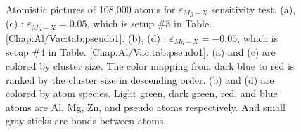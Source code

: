 \begin{figure}[!ht]
\caption[Atomistic pictures of 108,000 atoms for $\varepsilon_{Mg-X}$ sensitivity test.]{Atomistic pictures of 108,000 atoms for $\varepsilon_{Mg-X}$ sensitivity test. (a), (c) : $\varepsilon_{Mg-X} = 0.05$, which is setup \#3 in Table. \ref{Chap:Al/Vac:tab:pseudo1}. (b), (d) : $\varepsilon_{Mg-X} = -0.05$, which is setup \#4 in Table. \ref{Chap:Al/Vac:tab:pseudo1}. (a) and (c) are colored by cluster size. The color mapping from dark blue to red is ranked by the cluster size in descending order. (b) and (d) are colored by atom species. Light green, dark green, red, and blue atoms are Al, Mg, Zn, and pseudo atoms respectively. And small gray sticks are bonds between atoms.}
\label{Chap:Al/Vac:fig:sens_Mg}
\end{figure}
\endgroup

